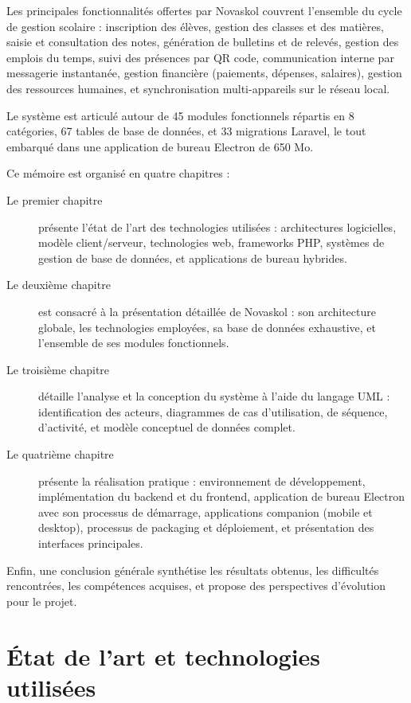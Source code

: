 \documentclass[12pt,a4paper,twoside]{report}
\begin{document}
Les principales fonctionnalités offertes par Novaskol couvrent l'ensemble du cycle de gestion scolaire : inscription des élèves, gestion des classes et des matières, saisie et consultation des notes, génération de bulletins et de relevés, gestion des emplois du temps, suivi des présences par QR code, communication interne par messagerie instantanée, gestion financière (paiements, dépenses, salaires), gestion des ressources humaines, et synchronisation multi-appareils sur le réseau local.

Le système est articulé autour de 45 modules fonctionnels répartis en 8 catégories, 67 tables de base de données, et 33 migrations Laravel, le tout embarqué dans une application de bureau Electron de 650 Mo.

Ce mémoire est organisé en quatre chapitres :
\begin{description}
    \item[Le premier chapitre] présente l'état de l'art des technologies utilisées : architectures logicielles, modèle client/serveur, technologies web, frameworks PHP, systèmes de gestion de base de données, et applications de bureau hybrides.
    \item[Le deuxième chapitre] est consacré à la présentation détaillée de Novaskol : son architecture globale, les technologies employées, sa base de données exhaustive, et l'ensemble de ses modules fonctionnels.
    \item[Le troisième chapitre] détaille l'analyse et la conception du système à l'aide du langage UML : identification des acteurs, diagrammes de cas d'utilisation, de séquence, d'activité, et modèle conceptuel de données complet.
    \item[Le quatrième chapitre] présente la réalisation pratique : environnement de développement, implémentation du backend et du frontend, application de bureau Electron avec son processus de démarrage, applications companion (mobile et desktop), processus de packaging et déploiement, et présentation des interfaces principales.
\end{description}

Enfin, une conclusion générale synthétise les résultats obtenus, les difficultés rencontrées, les compétences acquises, et propose des perspectives d'évolution pour le projet.

\chapter{État de l'art et technologies utilisées}
\end{document}
